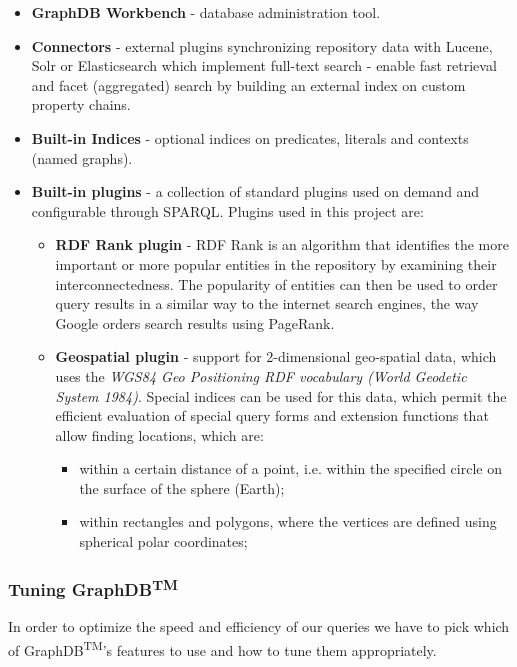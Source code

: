 \begin{itemize}
    \item \textbf{GraphDB Workbench} - database administration tool.
    \item \textbf{Connectors} - external plugins synchronizing repository data with Lucene, Solr or Elasticsearch which implement full-text search - enable fast retrieval and facet (aggregated) search by building an external index on custom property chains.
    \item \textbf{Built-in Indices} - optional indices on predicates, literals and contexts (named graphs).
    \item \textbf{Built-in plugins} - a collection of standard plugins used on demand and configurable through SPARQL. Plugins used in this project are:
        \begin{itemize}
            \item \textbf{RDF Rank plugin} - RDF Rank is an algorithm that identifies the more important or more popular entities in the repository by examining their interconnectedness. The popularity of entities can then be used to order query results in a similar way to the internet search engines, the way Google orders search results using PageRank.
            \item \textbf{Geospatial plugin} - support for 2-dimensional geo-spatial data, which uses the \textit{WGS84 Geo Positioning RDF vocabulary (World Geodetic System 1984)}. Special indices can be used for this data, which permit the efficient evaluation of special query forms and extension functions that allow finding locations, which are:
                \begin{itemize}
                    \item within a certain distance of a point, i.e. within the specified circle on the surface of the sphere (Earth);
                    \item within rectangles and polygons, where the vertices are defined using spherical polar coordinates;
                \end{itemize}
        \end{itemize}
\end{itemize}

\subsubsection{Tuning GraphDB\textsuperscript{TM}}
In order to optimize the speed and efficiency of our queries we have to pick which of GraphDB\textsuperscript{TM}'s features to use and how to tune them appropriately. 

